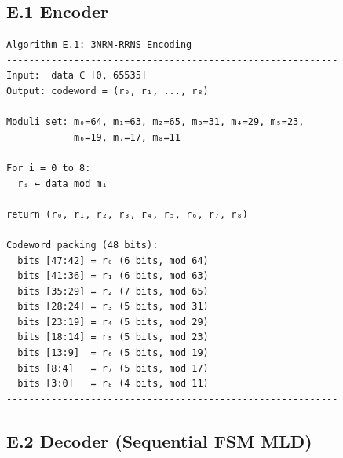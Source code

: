 \documentclass[
  12pt,
  a4paper]{report}
\begin{document}
\subsection{E.1 Encoder}\label{e.1-encoder}

\begin{verbatim}
Algorithm E.1: 3NRM-RRNS Encoding
-----------------------------------------------------------
Input:  data ∈ [0, 65535]
Output: codeword = (r₀, r₁, ..., r₈)

Moduli set: m₀=64, m₁=63, m₂=65, m₃=31, m₄=29, m₅=23,
            m₆=19, m₇=17, m₈=11

For i = 0 to 8:
  rᵢ ← data mod mᵢ

return (r₀, r₁, r₂, r₃, r₄, r₅, r₆, r₇, r₈)

Codeword packing (48 bits):
  bits [47:42] = r₀ (6 bits, mod 64)
  bits [41:36] = r₁ (6 bits, mod 63)
  bits [35:29] = r₂ (7 bits, mod 65)
  bits [28:24] = r₃ (5 bits, mod 31)
  bits [23:19] = r₄ (5 bits, mod 29)
  bits [18:14] = r₅ (5 bits, mod 23)
  bits [13:9]  = r₆ (5 bits, mod 19)
  bits [8:4]   = r₇ (5 bits, mod 17)
  bits [3:0]   = r₈ (4 bits, mod 11)
-----------------------------------------------------------
\end{verbatim}

\subsection{E.2 Decoder (Sequential FSM
MLD)}\label{e.2-decoder-sequential-fsm-mld}
\end{document}
